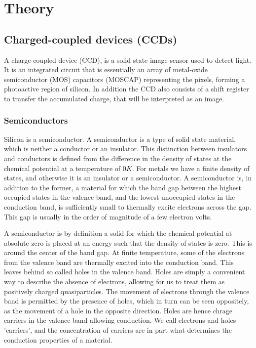 \documentclass[../main.tex]{subfiles}
\begin{document}
	
	\chapter{Theory}
	\section{Charged-coupled devices (CCDs)}
	A charge-coupled device (CCD), is a solid state image sensor used to detect light. It is an integrated circuit that is essentially an array of metal-oxide semiconductor (MOS) capacitors (MOSCAP) representing the pixels, forming a photoactive region of silicon. In addition the CCD also consists of a shift register to transfer the accumulated charge, that will be interpreted as an image. 
	
	\subsection{Semiconductors}
	Silicon is a semiconductor. A semiconductor is a type of solid state material, which is neither a conductor or an insulator. This distinction between insulators and conductors is defined from the difference in the density of states at the chemical potential at a temperature of $0K$\cite{solidstatephysicsbook}. For metals we have a finite density of states, and otherwise it is an insulator or a semiconductor. A semiconductor is, in addition to the former, a material for which the band gap between the highest occupied states in the valence band, and the lowest unoccupied states in the conduction band, is sufficiently small to thermally excite electrons across the gap. This gap is usually in the order of magnitude of a few electron volts. 
	
	A semiconductor is by definition a solid for which the chemical potential at absolute zero is placed at an energy such that the density of states is zero. This is around the center of the band gap. At finite temperature, some of the electrons from the valence band are thermally excited into the conduction band. This leaves behind so called holes in the valence band. Holes are simply a convenient way to describe the absence of electrons, allowing for us to treat them as positively charged quasiparticles. The movement of electrons through the valence band is permitted by the presence of holes, which in turn can be seen oppositely, as the movement of a hole in the opposite direction. Holes are hence chrage carriers in the valence band allowing conduction. We call electrons and holes 'carriers', and the concentration of carriers are in part what determines the conduction properties of a material. 
	
\end{document}
